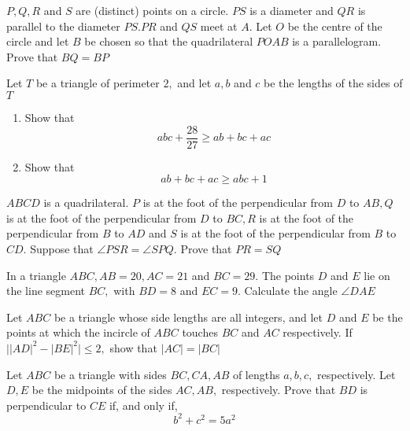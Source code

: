 \documentclass{pset}
\begin{document}
\begin{problems}
\begin{problem}[IrMO 2003 Q2]
    \(P, Q, R\) and \(S\) are (distinct) points on a circle. \(P S\) is a diameter and \(Q R\) is parallel to the diameter \(P S . P R\) and \(Q S\) meet at \(A .\) Let \(O\) be the centre of the circle and let \(B\) be chosen so that the quadrilateral \(P O A B\) is a parallelogram. Prove that \(B Q=B P\)
\end{problem}

\begin{problem}[IrMO 2003 Q6]
    Let \(T\) be a triangle of perimeter \(2,\) and let \(a, b\) and \(c\) be the lengths of the sides of \(T\)
    \begin{enumerate}
        \item Show that
        $$
        a b c+\frac{28}{27} \geq a b+b c+a c
        $$
        \item Show that
        $$
        a b+b c+a c \geq a b c+1
        $$
    \end{enumerate}
    
\end{problem}

\begin{problem}[IrMO 2003 Q7]
    \(A B C D\) is a quadrilateral. \(P\) is at the foot of the perpendicular from \(D\) to \(A B, Q\) is at the foot of the perpendicular from \(D\) to \(B C, R\) is at the foot of the perpendicular from \(B\) to \(A D\) and \(S\) is at the foot of the perpendicular from \(B\) to \(C D .\) Suppose that \(\angle P S R=\angle S P Q .\) Prove that \(P R=S Q\)
\end{problem}


\begin{problem}[IrMO 2002 Q1]
    In a triangle \(A B C, A B=20, A C=21\) and \(B C=29 .\) The points \(D\) and \(E\) lie on the line segment \(B C,\) with \(B D=8\) and \(E C=9 .\) Calculate the angle \(\angle D A E\)
\end{problem}

\begin{problem}[IrMO 2002 Q10]
    Let \(A B C\) be a triangle whose side lengths are all integers, and let \(D\) and \(E\) be the points at which the incircle of \(A B C\) touches \(B C\) and \(A C\) respectively. If \(\left.|| A D\right|^{2}-|B E|^{2} | \leq 2,\) show that \(|A C|=|B C|\)
\end{problem}

\begin{problem}[IrMO 2001 Q2]
    Let \(A B C\) be a triangle with sides \(B C, C A, A B\) of lengths \(a, b, c,\) respectively. Let
    \(D, E\) be the midpoints of the sides \(A C, A B,\) respectively. Prove that \(B D\) is perpendicular to \(C E\) if, and only if,
    $$
    b^{2}+c^{2}=5 a^{2}
    $$
\end{problem}


\end{problems}
\end{document}
